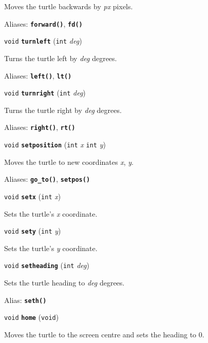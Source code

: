 \documentclass[a4paper,11pt]{article}
\newcommand{\V}{\texttt{void}}      %
\newcommand{\I}{\texttt{int}}       %
\newcommand{\func}[1]{\textbf{\texttt{#1}}}  %
\newcommand{\A}[1]{\emph{#1}}       %
\newenvironment{bgi}
{ %
  \begin{snugshade}
}
{ %
  \end{snugshade}
}
\begin{document}
Moves the turtle backwards by \A{px} pixels.

Aliases: \func{forward()}, \func{fd()}


\begin{bgi}
\V{} \func{turnleft} (\I{} \A{deg})
\end{bgi}

Turns the turtle left by \A{deg} degrees.

Aliases: \func{left()}, \func{lt()}


\begin{bgi}
\V{} \func{turnright} (\I{} \A{deg})
\end{bgi}

Turns the turtle right by \A{deg} degrees.

Aliases: \func{right()}, \func{rt()}


\begin{bgi}
\V{} \func{setposition} (\I{} \A{x} \I{} \A{y})
\end{bgi}

Moves the turtle to new coordinates \A{x}, \A{y}.

Aliases: \func{go\_to()}, \func{setpos()}


\begin{bgi}
\V{} \func{setx} (\I{} \A{x})
\end{bgi}

Sets the turtle's \A{x} coordinate.


\begin{bgi}
\V{} \func{sety} (\I{} \A{y})
\end{bgi}

Sets the turtle's \A{y} coordinate.


\begin{bgi}
\V{} \func{setheading} (\I{} \A{deg})
\end{bgi}

Sets the turtle heading to \A{deg} degrees.

Alias: \func{seth()}


\begin{bgi}
\V{} \func{home} (\V{})
\end{bgi}

Moves the turtle to the screen centre and sets the heading to 0.
\end{document}
